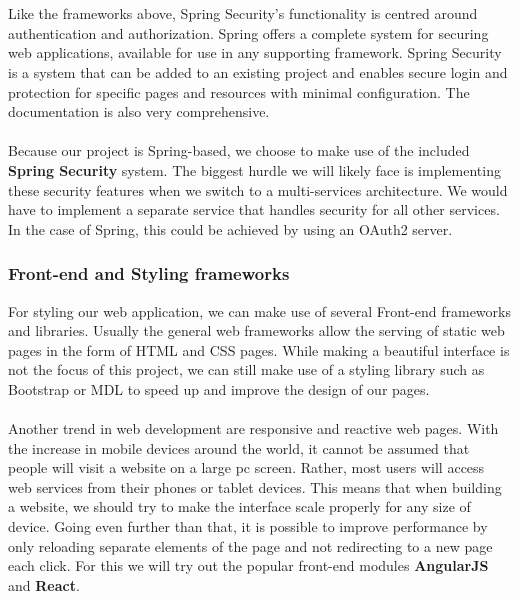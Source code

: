 \documentclass[12pt]{article}
\begin{document}
\begin{multicols}{2}
\\\\
Like the frameworks above, Spring Security’s functionality is centred around authentication and authorization. Spring offers a complete system for securing web applications, available for use in any supporting framework. Spring Security is a system that can be added to an existing project and enables secure login and protection for specific pages and resources with minimal configuration. The documentation is also very comprehensive.
\\\\
Because our project is Spring-based, we choose to make use of the included \textbf{Spring Security} system. The biggest hurdle we will likely face is implementing these security features when we switch to a multi-services architecture. We would have to implement a separate service that handles security for all other services. In the case of Spring, this could be achieved by using an OAuth2 server. \cite{SpringCloudSecurity52:online}

\subsubsection{Front-end and Styling frameworks}
For styling our web application, we can make use of several Front-end frameworks and libraries. Usually the general web frameworks allow the serving of static web pages in the form of HTML and CSS pages. While making a beautiful interface is not the focus of this project, we can still make use of a styling library such as Bootstrap or MDL to speed up and improve the design of our pages.
\\\\
Another trend in web development are responsive and reactive web pages. With the increase in mobile devices around the world, it cannot be assumed that people will visit a website on a large pc screen. Rather, most users will access web services from their phones or tablet devices. This means that when building a website, we should try to make the interface scale properly for any size of device. Going even further than that, it is possible to improve performance by only reloading separate elements of the page and not redirecting to a new page each click. For this we will try out the popular front-end modules \textbf{AngularJS} and \textbf{React}. 


\end{multicols}
\end{document}
